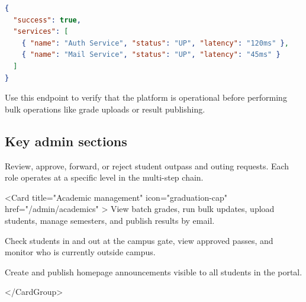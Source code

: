 \begin{lstlisting}[language=json]
{
  "success": true,
  "services": [
    { "name": "Auth Service", "status": "UP", "latency": "120ms" },
    { "name": "Mail Service", "status": "UP", "latency": "45ms" }
  ]
}

\end{lstlisting}

Use this endpoint to verify that the platform is operational before performing bulk operations like grade uploads or result publishing.

\subsection{Key admin sections}


\begin{tcolorbox}[colback=gray!5,colframe=primary,title=Documentation Note]

  
\begin{tcolorbox}[colback=gray!5,colframe=primary,title=Documentation Note]

    Review, approve, forward, or reject student outpass and outing requests.
    Each role operates at a specific level in the multi-step chain.
  
\end{tcolorbox}

  <Card
    title="Academic management"
    icon="graduation-cap"
    href="/admin/academics"
  >
    View batch grades, run bulk updates, upload students, manage semesters, and
    publish results by email.
  
\end{tcolorbox}

  
\begin{tcolorbox}[colback=gray!5,colframe=primary,title=Documentation Note]

    Check students in and out at the campus gate, view approved passes, and
    monitor who is currently outside campus.
  
\end{tcolorbox}

  
\begin{tcolorbox}[colback=gray!5,colframe=primary,title=Documentation Note]

    Create and publish homepage announcements visible to all students in the
    portal.
  
\end{tcolorbox}

</CardGroup>


